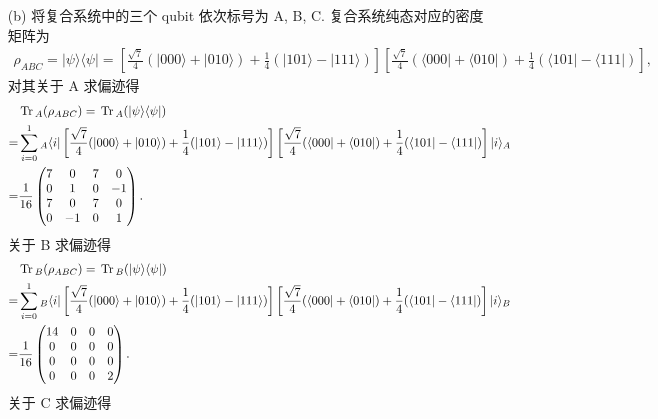 \documentclass{assignment}
\begin{document}
\begin{sol}
\begin{itemize}
        \item[(b)] 将复合系统中的三个 qubit 依次标号为 A, B, C. 复合系统纯态对应的密度矩阵为
        \begin{align}
            \rho_{ABC}=\lvert\psi\rangle\langle\psi\rvert=\left[\frac{\sqrt{7}}{4}(\lvert 000\rangle+\lvert 010\rangle)+\frac{1}{4}(\lvert 101\rangle-\lvert 111\rangle)\right]\left[\frac{\sqrt{7}}{4}(\langle 000\rvert+\langle 010\rvert)+\frac{1}{4}(\langle 101\rvert-\langle 111\rvert)\right],
        \end{align}
        对其关于 A 求偏迹得
        \begin{align}
            \notag&\,\mathrm{Tr}\,_A(\rho_{ABC})=\,\mathrm{Tr}\,_A(\lvert\psi\rangle\langle\psi\rvert)\\
            \notag=&\sum_{i=0}^1{}_A\langle i\rvert\left[\frac{\sqrt{7}}{4}(\lvert 000\rangle+\lvert 010\rangle)+\frac{1}{4}(\lvert 101\rangle-\lvert 111\rangle)\right]\left[\frac{\sqrt{7}}{4}(\langle 000\rvert+\langle 010\rvert)+\frac{1}{4}(\langle 101\rvert-\langle 111\rvert)\right]\lvert i\rangle_A\\
            =&\frac{1}{16}\begin{pmatrix}
                7&0&7&0\\
                0&1&0&-1\\
                7&0&7&0\\
                0&-1&0&1
            \end{pmatrix}.
        \end{align}
        关于 B 求偏迹得
        \begin{align}
            \notag&\,\mathrm{Tr}\,_B(\rho_{ABC})=\,\mathrm{Tr}\,_B(\lvert\psi\rangle\langle\psi\rvert)\\
            \notag=&\sum_{i=0}^1{}_B\langle i\rvert\left[\frac{\sqrt{7}}{4}(\lvert 000\rangle+\lvert 010\rangle)+\frac{1}{4}(\lvert 101\rangle-\lvert 111\rangle)\right]\left[\frac{\sqrt{7}}{4}(\langle 000\rvert+\langle 010\rvert)+\frac{1}{4}(\langle 101\rvert-\langle 111\rvert)\right]\lvert i\rangle_B\\
            =&\frac{1}{16}\begin{pmatrix}
                14&0&0&0\\
                0&0&0&0\\
                0&0&0&0\\
                0&0&0&2
            \end{pmatrix}.
        \end{align}
        关于 C 求偏迹得
        \begin{align}

\end{align}
\end{itemize}
\end{sol}
\end{document}
